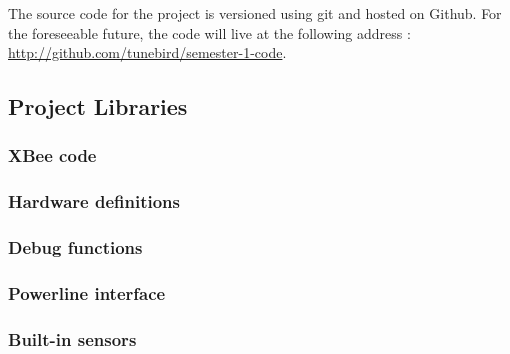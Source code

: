 The source code for the project is versioned using git and hosted on
Github. For the foreseeable future, the code will live
at the following address : \url{http://github.com/tunebird/semester-1-code}.


\subsection{Project Libraries}
\label{an:project-libs}

\subsubsection{XBee code}



\subsubsection{Hardware definitions}


\subsubsection{Debug functions}



\subsubsection{Powerline interface}



\subsubsection{Built-in sensors}



